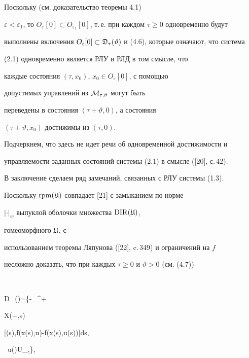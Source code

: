 \begin{notes}


Поскольку (см. доказательство теоремы 4.1)


$\varepsilon<\varepsilon_1$, то $O_{\varepsilon }[0]\subset


O_{\varepsilon_1}[0]$, т.\,е. при каждом $\tau\ge0$ одновременно будут


выполнены включения $O_\varepsilon[0]\subset


\frak D_\tau(\vartheta)$ и (4.6), которые означают, что система


(2.1) одновременно является РЛУ и РЛД в том смысле, что


каждые состояния $(\tau,x_0)$, $x_0\in O_\varepsilon[0]$, с помощью


допустимых управлений из $\cal M_{\tau,\vartheta}$ могут быть


переведены в состояния $(\tau+\vartheta,0)$, а состояния


$(\tau+\vartheta,x_0)$ достижимы из $(\tau,0)$.


Подчеркнем, что здесь не идет речи об одновременной достижимости и


управляемости заданных состояний системы (2.1) в смысле ([20], с.\,42).


\end{notes}


\setcounter{footnote}{0}





В заключение сделаем ряд замечаний, связанных с РЛУ системы (1.3).





Поскольку $\operatorname{rpm}(\frak U)$ совпадает [21] с замыканием по норме


$|\cdot|_w$ выпуклой оболочки множества $\operatorname{DIR}(\frak U)$,


гомеоморфного $\frak U$, с


использованием теоремы Ляпунова ([22], c.\,349) и ограничений на $f$


несложно доказать, что при каждых $\tau\ge0$ и $\vartheta>0$ (см. (4.7))


$$


\frak D_\tau(\vartheta)=\bigg\{-\int_\tau^{\tau+\vartheta}


X(\tau+\vartheta,s)


[\langle\wh\mu(s),f(\wh x(s),u)\rangle-f(\wh x(s),u(s))]ds,


\ u(\cdot)\in\cal U_{\tau,\vartheta}\bigg\},


